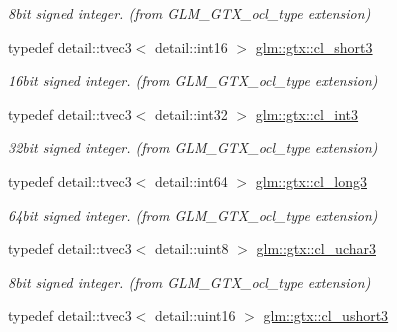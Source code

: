 \begin{DoxyCompactItemize}
\begin{DoxyCompactList}\small\item\em 8bit signed integer. (from G\+L\+M\+\_\+\+G\+T\+X\+\_\+ocl\+\_\+type extension) \end{DoxyCompactList}\item 
\hypertarget{group__gtx__ocl__type_ga79497b79fc33f64f8e382fa3b6dc4943}{}typedef detail\+::tvec3$<$ detail\+::int16 $>$ \hyperlink{group__gtx__ocl__type_ga79497b79fc33f64f8e382fa3b6dc4943}{glm\+::gtx\+::cl\+\_\+short3}\label{group__gtx__ocl__type_ga79497b79fc33f64f8e382fa3b6dc4943}

\begin{DoxyCompactList}\small\item\em 16bit signed integer. (from G\+L\+M\+\_\+\+G\+T\+X\+\_\+ocl\+\_\+type extension) \end{DoxyCompactList}\item 
\hypertarget{group__gtx__ocl__type_ga2d02ce128dc2171dd22c12728897b454}{}typedef detail\+::tvec3$<$ detail\+::int32 $>$ \hyperlink{group__gtx__ocl__type_ga2d02ce128dc2171dd22c12728897b454}{glm\+::gtx\+::cl\+\_\+int3}\label{group__gtx__ocl__type_ga2d02ce128dc2171dd22c12728897b454}

\begin{DoxyCompactList}\small\item\em 32bit signed integer. (from G\+L\+M\+\_\+\+G\+T\+X\+\_\+ocl\+\_\+type extension) \end{DoxyCompactList}\item 
\hypertarget{group__gtx__ocl__type_ga588b792ebfca763746414374a2c2c2bd}{}typedef detail\+::tvec3$<$ detail\+::int64 $>$ \hyperlink{group__gtx__ocl__type_ga588b792ebfca763746414374a2c2c2bd}{glm\+::gtx\+::cl\+\_\+long3}\label{group__gtx__ocl__type_ga588b792ebfca763746414374a2c2c2bd}

\begin{DoxyCompactList}\small\item\em 64bit signed integer. (from G\+L\+M\+\_\+\+G\+T\+X\+\_\+ocl\+\_\+type extension) \end{DoxyCompactList}\item 
\hypertarget{group__gtx__ocl__type_ga5f32718b585893678a6f097f58e6bc3b}{}typedef detail\+::tvec3$<$ detail\+::uint8 $>$ \hyperlink{group__gtx__ocl__type_ga5f32718b585893678a6f097f58e6bc3b}{glm\+::gtx\+::cl\+\_\+uchar3}\label{group__gtx__ocl__type_ga5f32718b585893678a6f097f58e6bc3b}

\begin{DoxyCompactList}\small\item\em 8bit signed integer. (from G\+L\+M\+\_\+\+G\+T\+X\+\_\+ocl\+\_\+type extension) \end{DoxyCompactList}\item 
\hypertarget{group__gtx__ocl__type_ga56c8a67242126334008de5d076334eff}{}typedef detail\+::tvec3$<$ detail\+::uint16 $>$ \hyperlink{group__gtx__ocl__type_ga56c8a67242126334008de5d076334eff}{glm\+::gtx\+::cl\+\_\+ushort3}\label{group__gtx__ocl__type_ga56c8a67242126334008de5d076334eff}


\end{DoxyCompactItemize}
